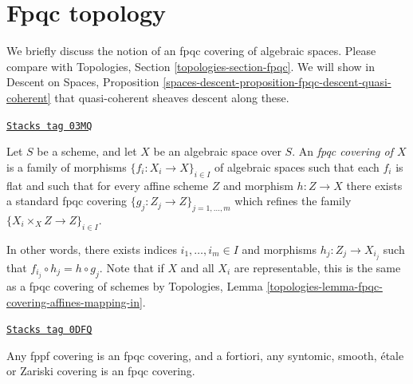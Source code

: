 \section{Fpqc topology}
\label{spaces-topologies-section-fpqc}
We briefly discuss the notion of an fpqc covering of algebraic spaces.
Please compare with
Topologies, Section \ref{topologies-section-fpqc}.
We will show in
Descent on Spaces,
Proposition \ref{spaces-descent-proposition-fpqc-descent-quasi-coherent}
that quasi-coherent sheaves descent along these.

\begin{definition}
\label{spaces-topologies-definition-fpqc-covering}
\href{https://stacks.math.columbia.edu/tag/03MQ}{\texttt{Stacks tag 03MQ}}

Let $S$ be a scheme, and let $X$ be an algebraic space over $S$.
An {\it fpqc covering of $X$} is a family of morphisms
$\{f_i : X_i \to X\}_{i \in I}$ of algebraic spaces
such that each $f_i$ is flat and such that for every affine scheme
$Z$ and morphism $h : Z \to X$ there exists a standard fpqc covering
$\{g_j : Z_j \to Z\}_{j = 1, \ldots, m}$ which refines the family
$\{X_i \times_X Z \to Z\}_{i \in I}$.
\end{definition}

In other words, there exists indices $i_1, \ldots, i_m \in I$ and
morphisms $h_j : Z_j \to X_{i_j}$ such that
$f_{i_j} \circ h_j = h \circ g_j$. Note that if $X$ and all $X_i$ are
representable, this is the same as a fpqc covering of schemes by
Topologies, Lemma \ref{topologies-lemma-fpqc-covering-affines-mapping-in}.

\begin{lemma}
\label{spaces-topologies-lemma-zariski-etale-smooth-syntomic-fppf-fpqc}
\href{https://stacks.math.columbia.edu/tag/0DFQ}{\texttt{Stacks tag 0DFQ}}

Any fppf covering is an fpqc covering, and a fortiori,
any syntomic, smooth, \'etale or Zariski covering is an fpqc covering.
\end{lemma}

